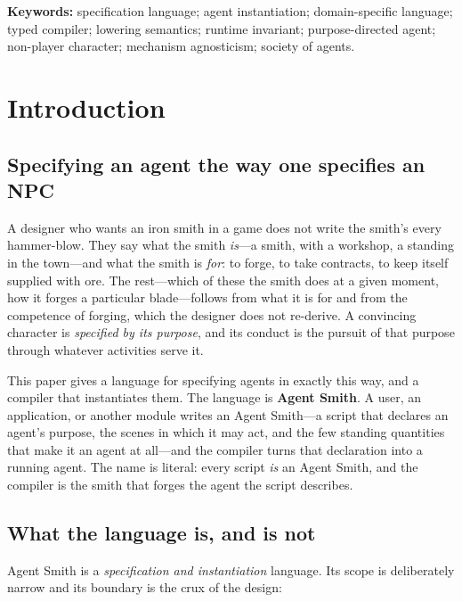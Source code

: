 \documentclass[11pt,twocolumn,a4paper]{article}
\begin{document}
\vspace{0.5em}
\noindent\textbf{Keywords:} specification language; agent instantiation;
domain-specific language; typed compiler; lowering semantics; runtime
invariant; purpose-directed agent; non-player character; mechanism
agnosticism; society of agents.

\section{Introduction}
\label{sec:intro}

\subsection{Specifying an agent the way one specifies an NPC}

A designer who wants an iron smith in a game does not write the smith's
every hammer-blow. They say what the smith \emph{is}---a smith, with a
workshop, a standing in the town---and what the smith is \emph{for}: to
forge, to take contracts, to keep itself supplied with ore. The rest---which
of these the smith does at a given moment, how it forges a particular
blade---follows from what it is for and from the competence of forging, which
the designer does not re-derive. A convincing character is \emph{specified by
its purpose}, and its conduct is the pursuit of that purpose through whatever
activities serve it.

This paper gives a language for specifying agents in exactly this way, and a
compiler that instantiates them. The language is \textbf{Agent Smith}. A
user, an application, or another module writes an Agent Smith---a script that
declares an agent's purpose, the scenes in which it may act, and the few
standing quantities that make it an agent at all---and the compiler turns
that declaration into a running agent. The name is literal: every script
\emph{is} an Agent Smith, and the compiler is the smith that forges the agent
the script describes.

\subsection{What the language is, and is not}

Agent Smith is a \emph{specification and instantiation} language. Its scope
is deliberately narrow and its boundary is the crux of the design:
\end{document}
